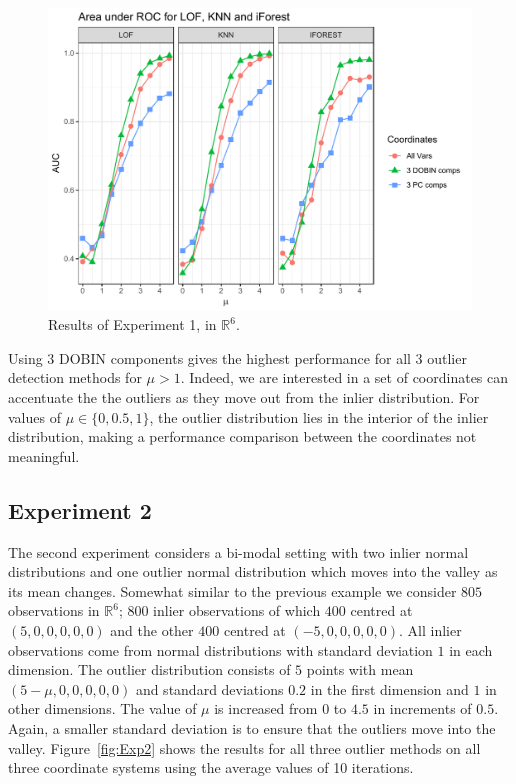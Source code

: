 \documentclass[a4paper,11pt]{article}
\begin{document}
\begin{figure}[!ht]
	\centering
	\includegraphics[scale=0.5]{Exp1.pdf}
	\caption{Results of Experiment 1, in $\mathbb{R}^6$.}
	\label{fig:Exp1}
\end{figure}

Using $3$ DOBIN components gives the highest performance for all $3$ outlier detection methods for $\mu > 1$.  Indeed, we are interested in a set of coordinates can accentuate the the outliers as they move out from the inlier distribution.  For values of $\mu \in \{0, 0.5, 1\}$,  the outlier distribution lies in the interior of the inlier distribution, making a performance comparison between the coordinates not meaningful.

\subsection{Experiment 2}
The second experiment considers a bi-modal setting with two inlier normal distributions and one outlier normal  distribution which moves into the valley as its mean changes. Somewhat similar to the previous example we consider $805$ observations in $\mathbb{R}^6$; $800$ inlier observations of which $400$  centred at $(5,0,0,0,0,0)$ and the other $400$ centred at $(-5,0,0,0,0,0)$. All inlier observations come from normal distributions with standard deviation $1$ in each dimension. The outlier distribution consists of $5$ points with mean $(5-\mu,0,0,0,0,0)$ and standard deviations $0.2$ in the first dimension and $1$ in other dimensions. The value of $\mu$ is increased from $0$ to $4.5$ in increments of $0.5$.  Again, a smaller standard deviation is to ensure that the outliers move into the valley. Figure~\ref{fig:Exp2} shows the results for all three  outlier methods on all three coordinate systems using the average values of 10 iterations.
\end{document}
